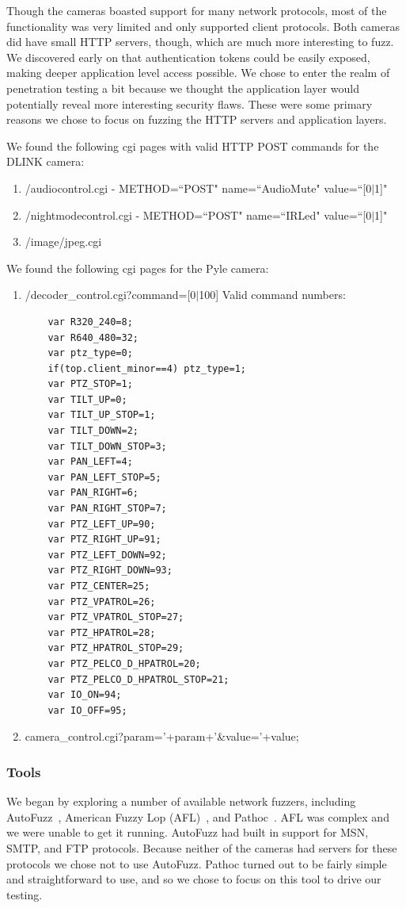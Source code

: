 \documentclass[letterpaper,twocolumn,10pt]{article}
\begin{document}
Though the cameras boasted support for many network protocols, most of the functionality was very limited and only supported client protocols. Both cameras did have small HTTP servers, though, which are much more interesting to fuzz. We discovered early on that authentication tokens could be easily exposed, making deeper application level access possible. We chose to enter the realm of penetration testing a bit because we thought the application layer would potentially reveal more interesting security flaws.  These were some primary reasons we chose to focus on fuzzing the HTTP servers and application layers. 

We found the following cgi pages with valid HTTP POST commands for the DLINK camera: 


\begin{enumerate}
	\item /audiocontrol.cgi - METHOD=``POST" name=``AudioMute" value=``[0$\mid$1]"
	\item /nightmodecontrol.cgi - METHOD=``POST" name=``IRLed" value=``[0$\mid$1]"
	\item /image/jpeg.cgi
\end{enumerate}

We found the following cgi pages for the Pyle camera:
\begin{enumerate}
	\item /decoder\_control.cgi?command=[0$\mid$100]
	\newline Valid command numbers:
	\begin{verbatim}
	var R320_240=8;
	var R640_480=32;
	var ptz_type=0;	
	if(top.client_minor==4) ptz_type=1;
	var PTZ_STOP=1;
	var TILT_UP=0;
	var TILT_UP_STOP=1;
	var TILT_DOWN=2;
	var TILT_DOWN_STOP=3;
	var PAN_LEFT=4;
	var PAN_LEFT_STOP=5;
	var PAN_RIGHT=6;
	var PAN_RIGHT_STOP=7;
	var PTZ_LEFT_UP=90;
	var PTZ_RIGHT_UP=91;
	var PTZ_LEFT_DOWN=92;
	var PTZ_RIGHT_DOWN=93;
	var PTZ_CENTER=25;
	var PTZ_VPATROL=26;
	var PTZ_VPATROL_STOP=27;
	var PTZ_HPATROL=28;
	var PTZ_HPATROL_STOP=29;
	var PTZ_PELCO_D_HPATROL=20;
	var PTZ_PELCO_D_HPATROL_STOP=21;
	var IO_ON=94;
	var IO_OFF=95;
	\end{verbatim}
	\item camera\_control.cgi?param='+param+'\&value='+value; 
\end{enumerate}


\subsubsection{Tools}
We began by exploring a number of available network fuzzers, including AutoFuzz~\cite{autofuzz}, American Fuzzy Lop (AFL)~\cite{afl}, and Pathoc~\cite{pathod}. AFL was complex and we were unable to get it running. AutoFuzz had built in support for MSN, SMTP, and FTP protocols. Because neither of the cameras had servers for these protocols we chose not to use AutoFuzz. Pathoc turned out to be fairly simple and straightforward to use, and so we chose to focus on this tool to drive our testing. 
\end{document}

